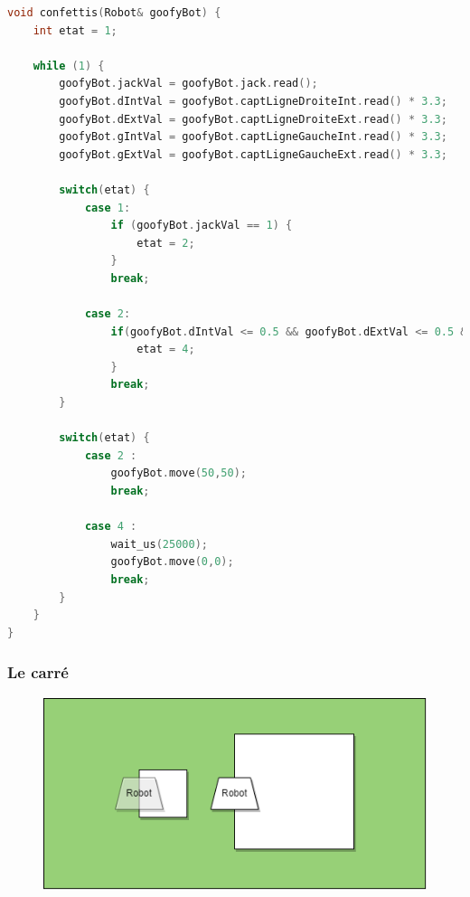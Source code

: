 \begin{lstlisting}[language={C++}, caption={Fonction confettis()}, label={confettis.cpp}]
void confettis(Robot& goofyBot) {
    int etat = 1;
    
    while (1) {
        goofyBot.jackVal = goofyBot.jack.read();
        goofyBot.dIntVal = goofyBot.captLigneDroiteInt.read() * 3.3;
        goofyBot.dExtVal = goofyBot.captLigneDroiteExt.read() * 3.3;
        goofyBot.gIntVal = goofyBot.captLigneGaucheInt.read() * 3.3;
        goofyBot.gExtVal = goofyBot.captLigneGaucheExt.read() * 3.3;

        switch(etat) {
            case 1:
                if (goofyBot.jackVal == 1) {
                    etat = 2;
                }
                break;
            
            case 2:
                if(goofyBot.dIntVal <= 0.5 && goofyBot.dExtVal <= 0.5 && goofyBot.gIntVal <= 0.5 && goofyBot.gExtVal <= 0.5) {
                    etat = 4;
                }
                break;
        }

        switch(etat) {
            case 2 :
                goofyBot.move(50,50);
                break;

            case 4 :
                wait_us(25000);
                goofyBot.move(0,0);
                break;
        }
    }
}
\end{lstlisting}

\subsubsection{Le carré}

\begin{figure}[H]
\centering
\begin{minipage}{.5\textwidth}
  \centering
  \centerline{\includegraphics[width=1\linewidth]{img/parcours/carre.png}}
  \label{fig:carre}
\end{minipage}%
\end{figure}

